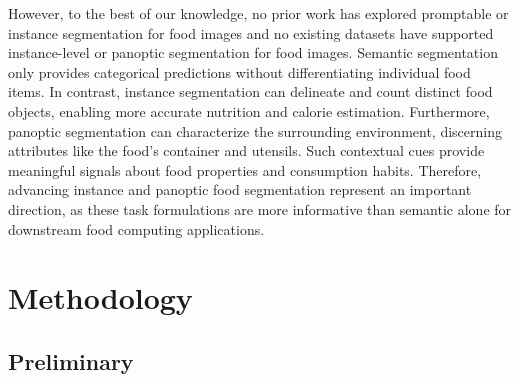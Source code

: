 \documentclass[lettersize,journal]{IEEEtran}
\begin{document}
However, to the best of our knowledge, no prior work has explored promptable or instance segmentation for food images and 
no existing datasets have supported instance-level or panoptic segmentation for food images. 
Semantic segmentation only provides categorical predictions without differentiating individual food items. 
In contrast, instance segmentation can delineate and count distinct food objects, enabling more accurate nutrition and calorie estimation. 
Furthermore, panoptic segmentation can characterize the surrounding environment, discerning attributes like the food's container and utensils. 
Such contextual cues provide meaningful signals about food properties and consumption habits. 
Therefore, advancing instance and panoptic food segmentation represent an important direction, 
as these task formulations are more informative than semantic alone for downstream food computing applications.



 
\section{Methodology}
\subsection{Preliminary}
\end{document}
